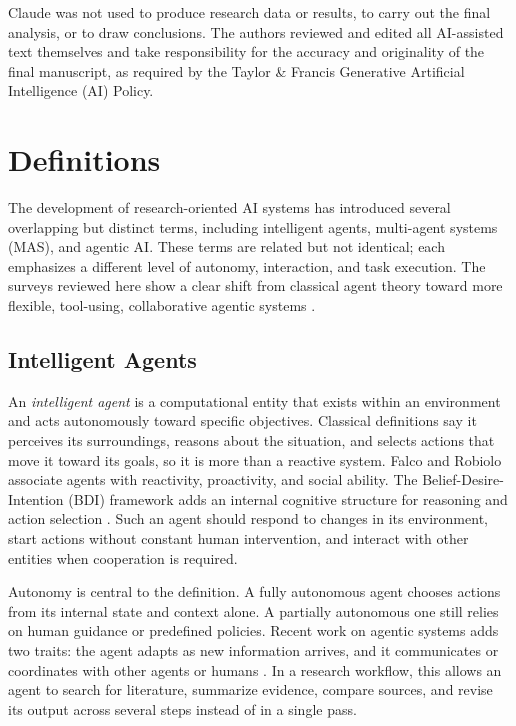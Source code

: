 \documentclass[sn-basic,Numbered]{sn-jnl}
\begin{document}
Claude was not used to produce research data or results, to carry out the final analysis, or to draw conclusions. The authors reviewed and edited all AI-assisted text themselves and take responsibility for the accuracy and originality of the final manuscript, as required by the Taylor \& Francis Generative Artificial Intelligence (AI) Policy.

\section{Definitions}
\label{sec:definitions}

The development of research-oriented AI systems has introduced several
overlapping but distinct terms, including intelligent agents,
multi-agent systems (MAS), and agentic AI. These terms are related but
not identical; each emphasizes a different level of autonomy,
interaction, and task execution. The surveys reviewed here show a
clear shift from classical agent theory toward more flexible,
tool-using, collaborative agentic systems
\cite{falco2019mas,deshmukh2025agentic,patil2025agenticaction}.

\subsection{Intelligent Agents}
An \emph{intelligent agent} is a computational entity that exists within an environment and acts autonomously toward specific objectives. Classical definitions say it perceives its surroundings, reasons about the situation, and selects actions that move it toward its goals, so it is more than a reactive system. Falco and Robiolo associate agents with reactivity, proactivity, and social ability. The Belief-Desire-Intention (BDI) framework adds an internal cognitive structure for reasoning and action selection \cite{falco2019mas}. Such an agent should respond to changes in its environment, start actions without constant human intervention, and interact with other entities when cooperation is required.

Autonomy is central to the definition. A fully autonomous agent chooses actions from its internal state and context alone. A partially autonomous one still relies on human guidance or predefined policies. Recent work on agentic systems adds two traits: the agent adapts as new information arrives, and it communicates or coordinates with other agents or humans \cite{deshmukh2025agentic,patil2025agenticaction}. In a research workflow, this allows an agent to search for literature, summarize evidence, compare sources, and revise its output across several steps instead of in a single pass.
\end{document}
